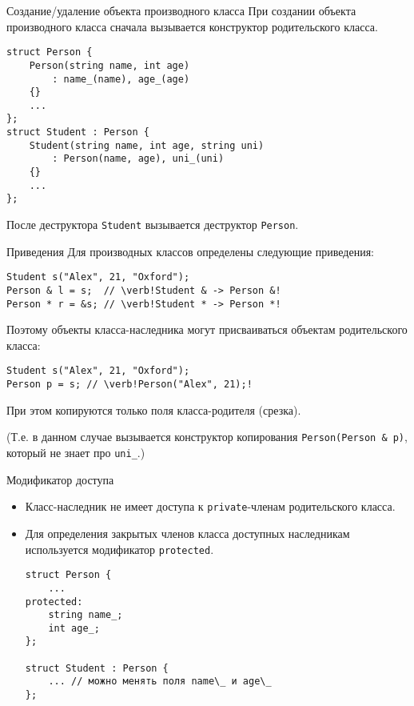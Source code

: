 \documentclass{beamer}
\begin{document}
\begin{frame}[fragile]{Создание/удаление объекта производного класса}
При создании объекта производного класса сначала вызывается конструктор
родительского класса.
\begin{lstlisting}
struct Person {
    Person(string name, int age)
        : name_(name), age_(age)
    {}
    ...
};
struct Student : Person {
    Student(string name, int age, string uni)
        : Person(name, age), uni_(uni)
    {}
    ...
};
\end{lstlisting}
После деструктора {\tt Student} вызывается деструктор {\tt Person}.
\end{frame}
\begin{frame}[fragile]{Приведения}
Для производных классов определены следующие приведения:
\begin{lstlisting}
Student s("Alex", 21, "Oxford");
Person & l = s;  // \verb!Student & -> Person &!
Person * r = &s; // \verb!Student * -> Person *!
\end{lstlisting}
Поэтому объекты класса-наследника могут присваиваться
объектам родительского класса:
\begin{lstlisting}
Student s("Alex", 21, "Oxford");
Person p = s; // \verb!Person("Alex", 21);!
\end{lstlisting}
При этом копируются только поля класса-родителя (срезка).

(Т.е. в данном случае вызывается конструктор копирования
{\tt Person(Person \& p)}, который не знает про {\tt uni\_}.)
\end{frame}

\begin{frame}[fragile]{Модификатор доступа }
\begin{itemize}
    \item Класс-наследник не имеет доступа к {\tt private}-членам 
        родительского класса.
        
    \item Для определения закрытых членов класса доступных наследникам
        используется модификатор {\tt protected}.
\begin{lstlisting}
struct Person {
    ...
protected:
    string name_;
    int age_;    
};

struct Student : Person {
    ... // можно менять поля name\_ и age\_
};
\end{lstlisting}
\end{itemize}
\end{frame}
\end{document}
